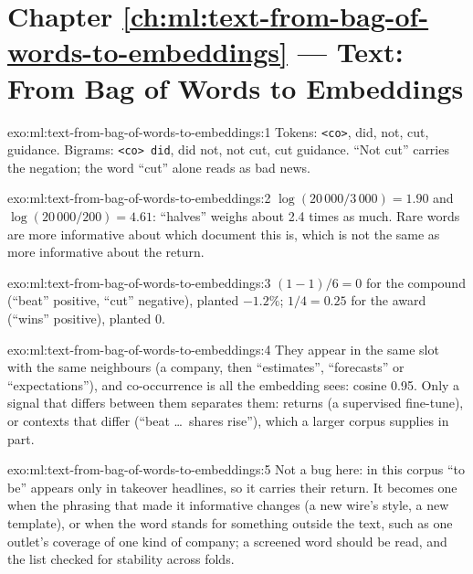 \section*{Chapter \ref{ch:ml:text-from-bag-of-words-to-embeddings} --- Text: From Bag of Words to Embeddings}

\begin{solution}{exo:ml:text-from-bag-of-words-to-embeddings:1}
Tokens: \texttt{<co>}, did, not, cut, guidance. Bigrams: \texttt{<co> did}, did not, not cut, cut guidance. ``Not cut''
carries the negation; the word ``cut'' alone reads as bad news.
\end{solution}

\begin{solution}{exo:ml:text-from-bag-of-words-to-embeddings:2}
$\log(20\,000/3\,000) = 1.90$ and $\log(20\,000/200) = 4.61$: ``halves'' weighs about 2.4 times as much. Rare words are
more informative about which document this is, which is not the same as more informative about the return.
\end{solution}

\begin{solution}{exo:ml:text-from-bag-of-words-to-embeddings:3}
$(1 - 1)/6 = 0$ for the compound (``beat'' positive, ``cut'' negative), planted $-1.2\%$; $1/4 = 0.25$ for the award
(``wins'' positive), planted 0.
\end{solution}

\begin{solution}{exo:ml:text-from-bag-of-words-to-embeddings:4}
They appear in the same slot with the same neighbours (a company, then ``estimates'', ``forecasts'' or ``expectations''), and
co-occurrence is all the embedding sees: cosine 0.95. Only a signal that differs between them separates them: returns (a
supervised fine-tune), or contexts that differ (``beat \dots\ shares rise''), which a larger corpus supplies in part.
\end{solution}

\begin{solution}{exo:ml:text-from-bag-of-words-to-embeddings:5}
Not a bug here: in this corpus ``to be'' appears only in takeover headlines, so it carries their return. It becomes one
when the phrasing that made it informative changes (a new wire's style, a new template), or when the word stands for
something outside the text, such as one outlet's coverage of one kind of company; a screened word should be read, and
the list checked for stability across folds.
\end{solution}


